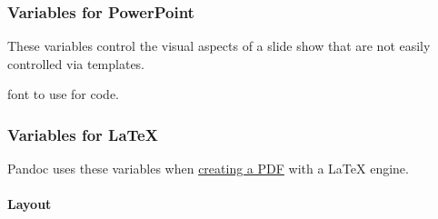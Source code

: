 \documentclass[
]{article}
\providecommand{\tightlist}{%
  \setlength{\itemsep}{0pt}\setlength{\parskip}{0pt}}
\begin{document}
\hypertarget{variables-for-powerpoint}{%
\subsubsection{Variables for
PowerPoint}\label{variables-for-powerpoint}}

These variables control the visual aspects of a slide show that are not
easily controlled via templates.

\begin{description}
\tightlist
\item[\texttt{monofont}]
font to use for code.
\end{description}

\hypertarget{variables-for-latex}{%
\subsubsection{Variables for LaTeX}\label{variables-for-latex}}

Pandoc uses these variables when
\protect\hyperlink{creating-a-pdf}{creating a PDF} with a LaTeX engine.

\hypertarget{layout}{%
\paragraph{Layout}\label{layout}}
\end{document}
